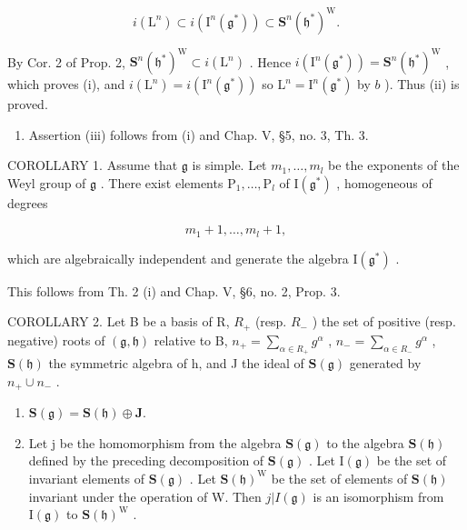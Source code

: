\[
i \left(\mathrm{L} ^ {n}\right) \subset i \left(\mathrm{I} ^ {n} \left(\mathfrak {g} ^ {*}\right)\right) \subset \mathbf {S} ^ {n} \left(\mathfrak {h} ^ {*}\right) ^ {\mathrm{W}}.
\]

By Cor. 2 of Prop. 2, \(\mathbf{S}^n (\mathfrak{h}^*)^{\mathrm{W}}\subset i(\mathrm{L}^n)\) . Hence \(i(\mathrm{I}^n (\mathfrak{g}^*)) = \mathbf{S}^n (\mathfrak{h}^*)^{\mathrm{W}}\) , which proves (i), and \(i(\mathrm{L}^n) = i(\mathrm{I}^n (\mathfrak{g}^*))\) so \(\mathrm{L}^n = \mathrm{I}^n (\mathfrak{g}^*)\) by \(b\) ). Thus (ii) is proved.

\begin{enumerate}
\def\labelenumi{\alph{enumi})}
\setcounter{enumi}{3}
\tightlist
\item
  Assertion (iii) follows from (i) and Chap. V, §5, no. 3, Th. 3.
\end{enumerate}

COROLLARY 1. Assume that \(\mathfrak{g}\) is simple. Let \(m_1, \ldots, m_l\) be the exponents of the Weyl group of \(\mathfrak{g}\) . There exist elements \(\mathrm{P}_1, \ldots, \mathrm{P}_l\) of \(\mathrm{I}(\mathfrak{g}^*)\) , homogeneous of degrees

\[
m _ {1} + 1, \dots , m _ {l} + 1,
\]

which are algebraically independent and generate the algebra \(\mathrm{I}(\mathfrak{g}^*)\) .

This follows from Th. 2 (i) and Chap. V, §6, no. 2, Prop. 3.

COROLLARY 2. Let B be a basis of R, \(R_{+}\) (resp. \(R_{-}\) ) the set of positive (resp. negative) roots of \((\mathfrak{g},\mathfrak{h})\) relative to B, \(n_{+}=\sum_{\alpha\in R_{+}}g^{\alpha}\) , \(n_{-}=\sum_{\alpha\in R_{-}}g^{\alpha}\) , \(\mathbf{S}(\mathfrak{h})\) the symmetric algebra of h, and J the ideal of \(\mathbf{S}(\mathfrak{g})\) generated by \(n_{+}\cup n_{-}\) .

\begin{enumerate}
\def\labelenumi{(\roman{enumi})}
\item
  \(\mathbf{S}(\mathfrak{g}) = \mathbf{S}(\mathfrak{h}) \oplus \mathbf{J}.\)
\item
  Let j be the homomorphism from the algebra \(\mathbf{S}(\mathfrak{g})\) to the algebra \(\mathbf{S}(\mathfrak{h})\) defined by the preceding decomposition of \(\mathbf{S}(\mathfrak{g})\) . Let \(\mathrm{I}(\mathfrak{g})\) be the set of invariant elements of \(\mathbf{S}(\mathfrak{g})\) . Let \(\mathbf{S}(\mathfrak{h})^{\mathrm{W}}\) be the set of elements of \(\mathbf{S}(\mathfrak{h})\) invariant under the operation of W. Then \(j|I(\mathfrak{g})\) is an isomorphism from \(\mathrm{I}(\mathfrak{g})\) to \(\mathbf{S}(\mathfrak{h})^{\mathrm{W}}\) .
\end{enumerate}

